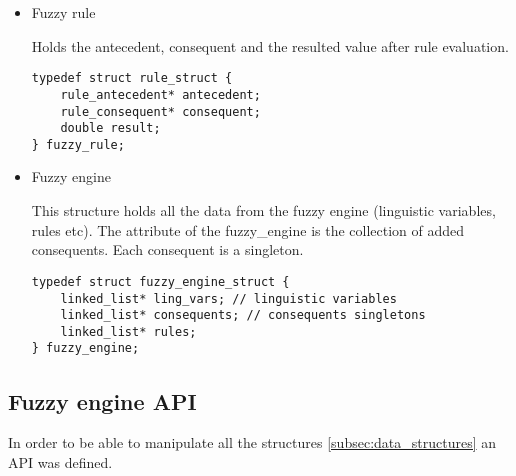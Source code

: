 \begin{itemize}
\item Fuzzy rule \par
Holds the antecedent, consequent and the resulted value after rule evaluation.
\begin{lstlisting}[frame=single]
typedef struct rule_struct {
    rule_antecedent* antecedent;
    rule_consequent* consequent;
    double result;
} fuzzy_rule;
\end{lstlisting}

\item Fuzzy engine \par
This structure holds all the data from the fuzzy engine (linguistic variables, rules etc).
The attribute  of the fuzzy\_engine is the collection of added consequents. Each consequent
is a singleton.
\begin{lstlisting}[frame=single]
typedef struct fuzzy_engine_struct {
    linked_list* ling_vars; // linguistic variables
    linked_list* consequents; // consequents singletons
    linked_list* rules;
} fuzzy_engine;
\end{lstlisting}

\end{itemize}

\subsection{Fuzzy engine API}

\qquad In order to be able to manipulate all the structures \ref{subsec:data_structures} an API was defined.


